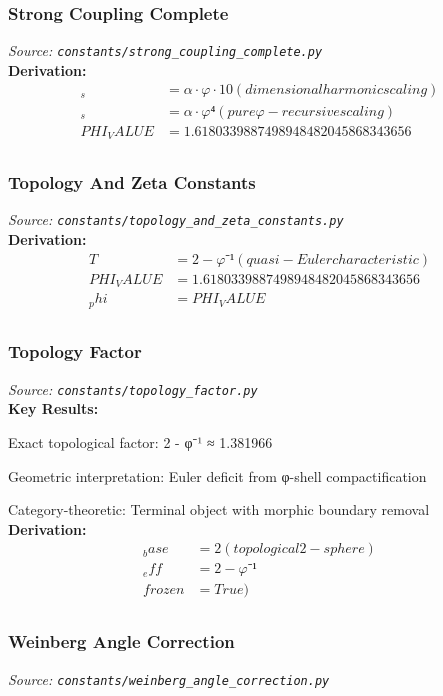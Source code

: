 \subsubsection{Strong Coupling Complete}
\textit{Source: \texttt{constants/strong_coupling_complete.py}}\\

\textbf{Derivation:}
\begin{align}
_s &= α · φ · 10 (dimensional harmonic scaling) \\
_s &= α · φ⁴ (pure φ-recursive scaling) \\
PHI_VALUE &= 1.6180339887498948482045868343656 \\
\end{align}

\subsubsection{Topology And Zeta Constants}
\textit{Source: \texttt{constants/topology_and_zeta_constants.py}}\\

\textbf{Derivation:}
\begin{align}
T &= 2 - φ⁻¹ (quasi-Euler characteristic) \\
PHI_VALUE &= 1.6180339887498948482045868343656 \\
_phi &= PHI_VALUE \\
\end{align}

\subsubsection{Topology Factor}
\textit{Source: \texttt{constants/topology_factor.py}}\\

\textbf{Key Results:}
\item Exact topological factor: 2 - φ⁻¹ ≈ 1.381966
\item Geometric interpretation: Euler deficit from φ-shell compactification
\item Category-theoretic: Terminal object with morphic boundary removal
\textbf{Derivation:}
\begin{align}
_base &= 2 (topological 2-sphere) \\
_eff &= 2 - φ⁻¹ \\
frozen &= True) \\
\end{align}

\subsubsection{Weinberg Angle Correction}
\textit{Source: \texttt{constants/weinberg_angle_correction.py}}\\

